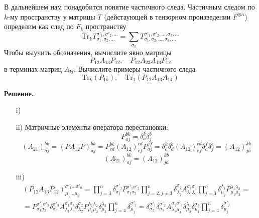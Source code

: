 \documentclass[12pt]{article}
\theoremstyle{definition}
\begin{document}
\begin{enumerate}
\begin{itemize}
        В дальнейшем нам понадобится понятие частичного следа. Частичным следом по $k$-му пространству у матрицы $T$ (дейстаующей в тензорном произведении $F^{\otimes n}$) определим как след по $F_k$ пространству
        \begin{equation}
            \text{Tr}_kT_{\sigma_1,\sigma_2,...}^{\sigma'_1,\sigma'_2,...}=\sum\limits_{\sigma_k}T^{\sigma'_1,\sigma'_2,...,\sigma_k,...}_{\sigma_1,\sigma_2,...,\sigma_k,...}
        \end{equation}
        Чтобы выучить обозначения, вычислите явно матрицы
        \begin{equation}
            P_{12}A_{13}P_{12},\quad P_{12}A_{23}A_{13}P_{12}
        \end{equation}
        в терминах матриц $A_{kl}$. Вычислите примеры частичного следа
        \begin{equation}
            \text{Tr}_k(P_{1k}),\quad\text{Tr}_1(P_{12}A_{13}A_{14})
        \end{equation}
    \end{itemize}
    \textbf{Решение.}
    \begin{itemize}
        \item[i)]
        \item[ii)] Матричные элементы оператора перестановки:
        \begin{equation}
            \boxed{P^{bk}_{aj}=\delta_a^k\delta_j^b}
        \end{equation}
        \begin{equation}
            (A_{21})_{aj}^{bk}=(PA_{12}P)^{bk}_{aj}=P^{bk}_{cd}(A_{12})^{cd}_{ef}P^{ef}_{aj}=\delta^k_c\delta^b_d(A_{12})^{cd}_{ef}\delta_a^f\delta_j^e=(A_{12})^{kb}_{ja}
        \end{equation}
        \begin{equation}
            \boxed{(A_{21})_{aj}^{bk}=(A_{12})^{kb}_{ja}}
        \end{equation}
        \item[iii)]
        \begin{multline}
            (P_{12}A_{13}P_{12})^{\sigma'_1...\sigma'_n}_{\mu_1...\mu_n}=\prod\limits_{j=3}^n\delta^{\sigma'_j}_{\sigma_j}P^{\sigma'_1\sigma'_2}_{\sigma_1\sigma_2}\prod\limits_{j=2,j\neq3}^n\delta^{\sigma_j}_{\lambda_j}A^{\sigma_1\sigma_3}_{\lambda_1\lambda_4}\prod\limits_{j=3}^n\delta^{\lambda_j}_{\mu_j}P^{\lambda_1\lambda_2}_{\mu_1\mu_2}=\\=P^{\sigma'_1\sigma'_2}_{\sigma_1\sigma_2}\delta^{\sigma'_3}_{\sigma_3}A^{\sigma_1\sigma_3}_{\lambda_1\lambda_3}\delta^{\sigma_2}_{\lambda_2}P^{\lambda_1\lambda_2}_{\mu_1\mu_2}\delta^{\lambda_3}_{\mu_3}\prod\limits_{j=4}^n\delta^{\sigma'_j}_{\mu_j}=\delta^{\sigma'_1}_{\sigma_2}\delta^{\sigma'_2}_{\sigma_1}A^{\sigma_1\sigma'_3}_{\lambda_1\mu_3}\delta^{\lambda_1}_{\mu_2}\delta^{\sigma_2}_{\mu_1}\prod\limits_{j=4}^n\delta^{\sigma'_j}_{\mu_j}

\end{multline}
\end{itemize}
\end{enumerate}
\end{document}
